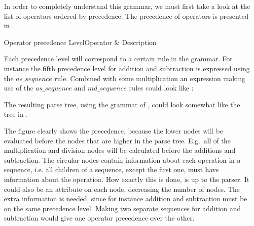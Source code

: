 In order to completely understand this grammar, we must first take a look at the list of
operators ordered by precedence. The precedence of operators is presented in
.

                  {Operator precedence}
           {Level}{Operator & Description}{
}

Each precedence level will correspond to a certain rule in the grammar. For
instance the fifth precedence level for addition and subtraction is expressed
using the $as\_sequence$ rule. Combined with some multiplication an expression
making use of the $as\_sequence$ and $md\_sequence$ rules could look like
:


The resulting parse tree, using the grammar of \productname{}, could look
somewhat like the tree in .



The figure clearly shows the precedence, because the lower nodes will be
evaluated before the nodes that are higher in the parse tree. E.g.\ all of the
multiplication and division nodes will be calculated before the additions and
subtraction. The circular nodes contain information about each operation in a
sequence, i.e. all children of a sequence, except the first one, must have
information about the operation. How exactly this is done, is up to the parser.
It could also be an attribute on each node, decreasing the number of nodes. The
extra information is needed, since for instance addition and subtraction must be
on the same precedence level. Making two separate sequences for addition and
subtraction would give one operator precedence over the other.

